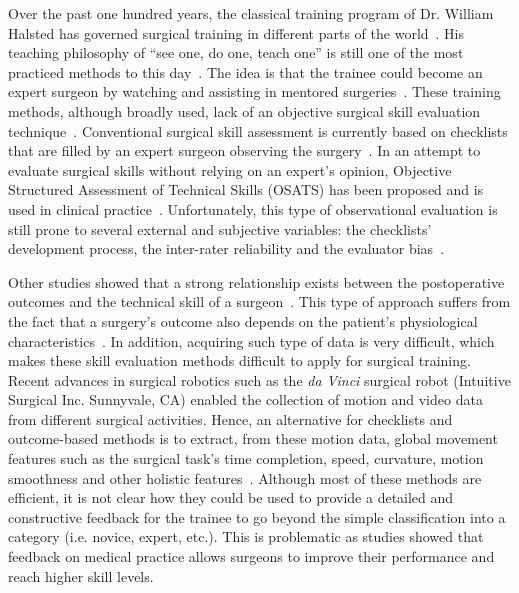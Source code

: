 \documentclass{llncs}
\begin{document}
Over the past one hundred years, the classical training program of Dr. William Halsted has governed surgical training in different parts of the world~\cite{polavarapu2013100}.
His teaching philosophy of ``see one, do one, teach one'' is still one of the most practiced methods to this day~\cite{ahmidi2017a}.
The idea is that the trainee could become an expert surgeon by watching and assisting in mentored surgeries~\cite{polavarapu2013100}.
These training methods, although broadly used, lack of an objective surgical skill evaluation technique~\cite{kassahun2016surgical}. 
Conventional surgical skill assessment is currently based on checklists that are filled by an expert surgeon observing the surgery~\cite{tedesco2008simulation}.
In an attempt to evaluate surgical skills without relying on an expert's opinion, Objective Structured Assessment of Technical Skills (OSATS) has been proposed and is used in clinical practice~\cite{niitsu2013using}.
Unfortunately, this type of observational evaluation is still prone to several external and subjective variables: the checklists' development process, the inter-rater reliability and the evaluator bias~\cite{hatala2015constructing}. 

Other studies showed that a strong relationship exists between the postoperative outcomes and the technical skill of a surgeon~\cite{bridgewater2003surgeon}. 
This type of approach suffers from the fact that a surgery's outcome also depends on the patient's physiological characteristics~\cite{kassahun2016surgical}. 
In addition, acquiring such type of data is very difficult, which makes these skill evaluation methods difficult to apply for surgical training.
Recent advances in surgical robotics such as the \emph{da Vinci} surgical robot (Intuitive Surgical Inc. Sunnyvale, CA) enabled the collection of motion and video data from different surgical activities.
Hence, an alternative for checklists and outcome-based methods is to extract, from these motion data, global movement features such as the surgical task's time completion, speed, curvature, motion smoothness and other holistic features~\cite{fard2018automated,zia2017automated,kassahun2016surgical}. 
Although most of these methods are efficient, it is not clear how they could be used to provide a detailed and constructive feedback for the trainee to go beyond the simple classification into a category (i.e. novice, expert, etc.). 
This is problematic as studies \cite{islam2016affordable} showed that feedback on medical practice allows surgeons to improve their performance and reach higher skill levels.
\end{document}
